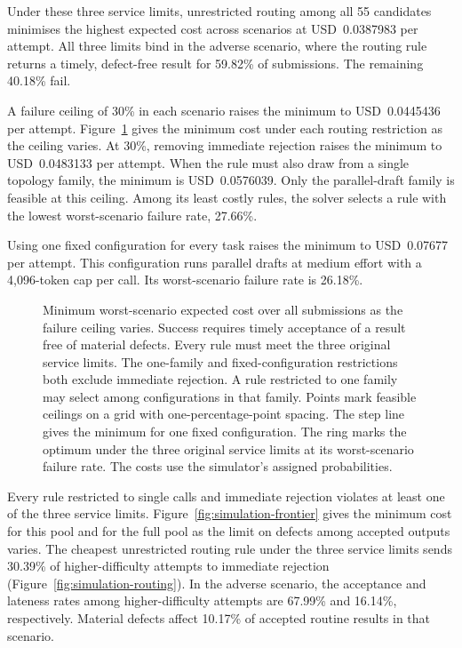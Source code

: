 \documentclass[11pt,reqno]{amsart}
\theoremstyle{definition}
\theoremstyle{remark}
\begin{document}
Under these three service limits, unrestricted routing among all 55 candidates minimises the highest expected cost across scenarios at USD~0.0387983 per attempt. All three limits bind in the adverse scenario, where the routing rule returns a timely, defect-free result for 59.82\% of submissions. The remaining 40.18\% fail.

A failure ceiling of 30\% in each scenario raises the minimum to USD~0.0445436 per attempt. Figure~\ref{fig:joint-failure-frontier} gives the minimum cost under each routing restriction as the ceiling varies. At 30\%, removing immediate rejection raises the minimum to USD~0.0483133 per attempt. When the rule must also draw from a single topology family, the minimum is USD~0.0576039. Only the parallel-draft family is feasible at this ceiling. Among its least costly rules, the solver selects a rule with the lowest worst-scenario failure rate, 27.66\%.

Using one fixed configuration for every task raises the minimum to USD~0.07677 per attempt. This configuration runs parallel drafts at medium effort with a 4,096-token cap per call. Its worst-scenario failure rate is 26.18\%.

\begin{figure}[tbp]
\centering

\caption{Minimum worst-scenario expected cost over all submissions as the failure ceiling varies. Success requires timely acceptance of a result free of material defects. Every rule must meet the three original service limits. The one-family and fixed-configuration restrictions both exclude immediate rejection. A rule restricted to one family may select among configurations in that family. Points mark feasible ceilings on a grid with one-percentage-point spacing. The step line gives the minimum for one fixed configuration. The ring marks the optimum under the three original service limits at its worst-scenario failure rate. The costs use the simulator's assigned probabilities.}
\label{fig:joint-failure-frontier}
\end{figure}

Every rule restricted to single calls and immediate rejection violates at least one of the three service limits. Figure~\ref{fig:simulation-frontier} gives the minimum cost for this pool and for the full pool as the limit on defects among accepted outputs varies.
The cheapest unrestricted routing rule under the three service limits sends 30.39\% of higher-difficulty attempts to immediate rejection (Figure~\ref{fig:simulation-routing}). In the adverse scenario, the acceptance and lateness rates among higher-difficulty attempts are 67.99\% and 16.14\%, respectively. Material defects affect 10.17\% of accepted routine results in that scenario.
\end{document}
